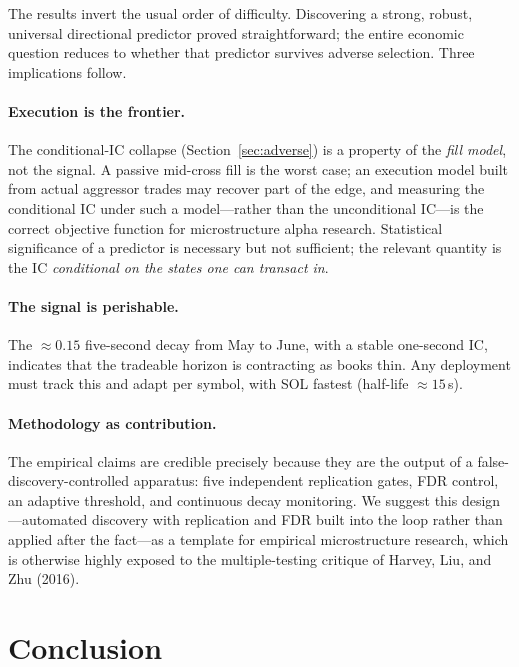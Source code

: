 \documentclass[11pt,a4paper]{article}
\theoremstyle{definition}
\theoremstyle{plain}
\begin{document}
The results invert the usual order of difficulty. Discovering a strong, robust, universal
directional predictor proved straightforward; the entire economic question reduces to whether
that predictor survives adverse selection. Three implications follow.

\paragraph{Execution is the frontier.} The conditional-IC collapse (Section~\ref{sec:adverse}) is a
property of the \emph{fill model}, not the signal. A passive mid-cross fill is the worst case; an
execution model built from actual aggressor trades may recover part of the edge, and measuring the
conditional IC under such a model---rather than the unconditional IC---is the correct objective
function for microstructure alpha research. Statistical significance of a predictor is necessary
but not sufficient; the relevant quantity is the IC \emph{conditional on the states one can
transact in}.

\paragraph{The signal is perishable.} The $\approx 0.15$ five-second decay from May to June, with a
stable one-second IC, indicates that the tradeable horizon is contracting as books thin. Any
deployment must track this and adapt per symbol, with SOL fastest (half-life $\approx 15$\,s).

\paragraph{Methodology as contribution.} The empirical claims are credible precisely because they
are the output of a false-discovery-controlled apparatus: five independent replication gates, FDR
control, an adaptive threshold, and continuous decay monitoring. We suggest this design---automated
discovery with replication and FDR built into the loop rather than applied after the fact---as a
template for empirical microstructure research, which is otherwise highly exposed to the
multiple-testing critique of Harvey, Liu, and Zhu (2016).

\section{Conclusion}
\label{sec:conclusion}
\end{document}
